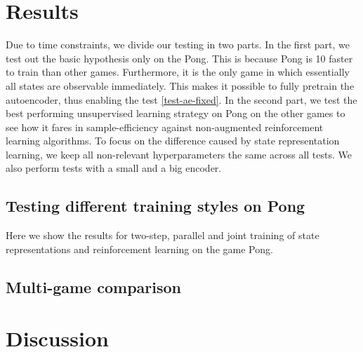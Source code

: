 \chapter{Results}
Due to time constraints, we divide our testing in two parts.
In the first part, we test out the basic hypothesis only on the Pong.
This is because Pong is 10 faster to train than other games.
Furthermore, it is the only game in which essentially all states 
are observable immediately.
This makes it possible to fully pretrain the autoencoder,
thus enabling the test \ref{test-ae-fixed}.
In the second part, we test the best performing unsupervised learning
strategy on Pong on the other games to see how it fares in sample-efficiency
against non-augmented reinforcement learning algorithms.
To focus on the difference caused by state representation learning,
we keep all non-relevant hyperparameters the same across all tests.
We also perform tests with a small and a big encoder.

\section{Testing different training styles on Pong}
Here we show the results for two-step, parallel and joint training
of state representations and reinforcement learning on the game Pong.


\section{Multi-game comparison}



\chapter{Discussion}
